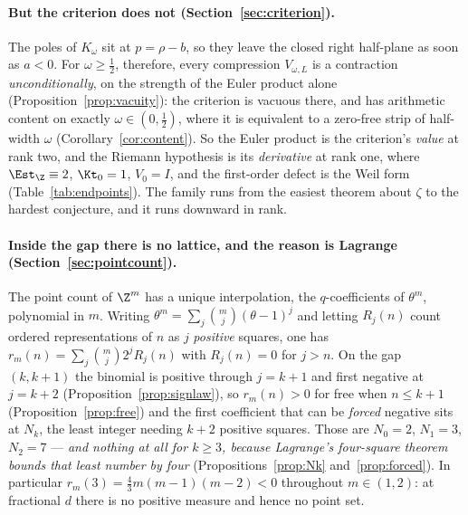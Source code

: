 \paragraph{But the criterion does not (Section~\ref{sec:criterion}).} The poles
of $K_\omega$ sit at $p=\rho-b$, so they leave the closed right half-plane as
soon as $a<0$. For $\omega\ge\frac12$, therefore, every compression
$V_{\omega,L}$ is a contraction \emph{unconditionally}, on the strength of the
Euler product alone (Proposition~\ref{prop:vacuity}): the criterion is vacuous
there, and has arithmetic content on exactly $\omega\in(0,\frac12)$, where it is
equivalent to a zero-free strip of half-width $\omega$
(Corollary~\ref{cor:content}). So the Euler product is the criterion's
\emph{value} at rank two, and the Riemann hypothesis is its \emph{derivative} at
rank one, where $\Est_{\Z}\equiv2$, $\Kt_0=1$, $V_0=I$, and the first-order
defect is the Weil form (Table~\ref{tab:endpoints}). The family runs from the
easiest theorem about $\zeta$ to the hardest conjecture, and it runs downward in
rank.

\paragraph{Inside the gap there is no lattice, and the reason is Lagrange
(Section~\ref{sec:pointcount}).} The point count of $\Z^{m}$ has a unique
interpolation, the $q$-coefficients of $\theta^{m}$, polynomial in $m$. Writing
$\theta^{m}=\sum_j\binom mj(\theta-1)^{j}$ and letting $R_j(n)$ count ordered
representations of $n$ as $j$ \emph{positive} squares, one has
$r_m(n)=\sum_j\binom mj2^{j}R_j(n)$ with $R_j(n)=0$ for $j>n$. On the gap
$(k,k+1)$ the binomial is positive through $j=k+1$ and first negative at
$j=k+2$ (Proposition~\ref{prop:signlaw}), so $r_m(n)>0$ for free when $n\le k+1$
(Proposition~\ref{prop:free}) and the first coefficient that can be \emph{forced}
negative sits at $N_k$, the least integer needing $k+2$ positive squares. Those
are $N_0=2$, $N_1=3$, $N_2=7$ --- \emph{and nothing at all for $k\ge3$, because
Lagrange's four-square theorem bounds that least number by four}
(Propositions~\ref{prop:Nk} and~\ref{prop:forced}). In particular
$r_m(3)=\frac43m(m-1)(m-2)<0$ throughout $m\in(1,2)$: at fractional $d$ there is
no positive measure and hence no point set.

